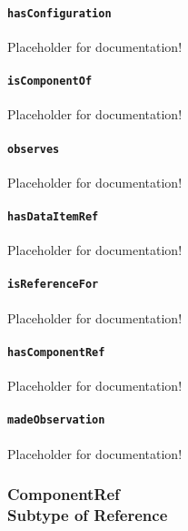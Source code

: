 \paragraph{\texttt{hasConfiguration}}\mbox{}
\newline\tab Placeholder for documentation!

\paragraph{\texttt{isComponentOf}}\mbox{}
\newline\tab Placeholder for documentation!

\paragraph{\texttt{observes}}\mbox{}
\newline\tab Placeholder for documentation!

\paragraph{\texttt{hasDataItemRef}}\mbox{}
\newline\tab Placeholder for documentation!

\paragraph{\texttt{isReferenceFor}}\mbox{}
\newline\tab Placeholder for documentation!

\paragraph{\texttt{hasComponentRef}}\mbox{}
\newline\tab Placeholder for documentation!

\paragraph{\texttt{madeObservation}}\mbox{}
\newline\tab Placeholder for documentation!
\FloatBarrier
\subsubsection[ComponentRef]{ComponentRef \\ {\small Subtype of Reference}}
  \label{type:ComponentRef}

